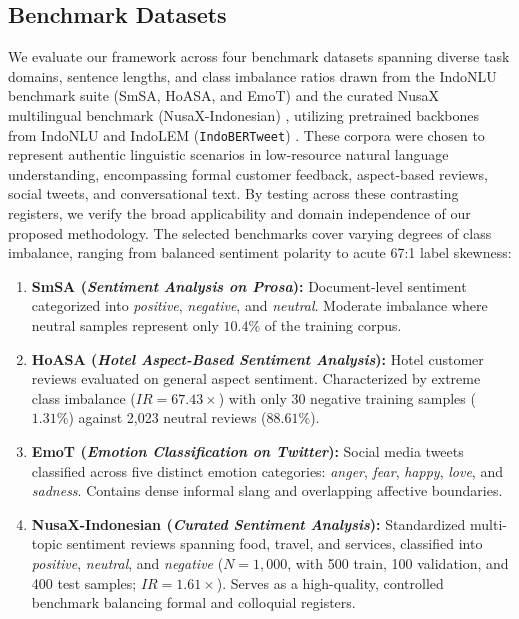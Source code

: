 \documentclass{ieeeaccess}
\begin{document}
\begin{table}[!t]
\caption{Benchmark Dataset Statistics and Split Distributions Across the Four Evaluated Corpora}
\label{tab:dataset_stats}
\centering
\footnotesize
\setlength{\tabcolsep}{4.5pt}

\end{table}

\subsection{Benchmark Datasets}
\label{subsec:datasets}

We evaluate our framework across four benchmark datasets spanning diverse task domains, sentence lengths, and class imbalance ratios drawn from the IndoNLU benchmark suite (SmSA, HoASA, and EmoT) \cite{wilie2020indonlu} and the curated NusaX multilingual benchmark (NusaX-Indonesian) \cite{winata2023nusax}, utilizing pretrained backbones from IndoNLU and IndoLEM (\texttt{IndoBERTweet}) \cite{koto2020indolem}. These corpora were chosen to represent authentic linguistic scenarios in low-resource natural language understanding, encompassing formal customer feedback, aspect-based reviews, social tweets, and conversational text. By testing across these contrasting registers, we verify the broad applicability and domain independence of our proposed methodology. The selected benchmarks cover varying degrees of class imbalance, ranging from balanced sentiment polarity to acute 67:1 label skewness:
\begin{enumerate}
    \item \textbf{SmSA (\textit{Sentiment Analysis on Prosa}):} Document-level sentiment categorized into \textit{positive}, \textit{negative}, and \textit{neutral}. Moderate imbalance where neutral samples represent only $10.4\%$ of the training corpus.
    \item \textbf{HoASA (\textit{Hotel Aspect-Based Sentiment Analysis}):} Hotel customer reviews evaluated on general aspect sentiment. Characterized by extreme class imbalance ($IR = 67.43\times$) with only 30 negative training samples ($1.31\%$) against 2,023 neutral reviews ($88.61\%$).
    \item \textbf{EmoT (\textit{Emotion Classification on Twitter}):} Social media tweets classified across five distinct emotion categories: \textit{anger}, \textit{fear}, \textit{happy}, \textit{love}, and \textit{sadness}. Contains dense informal slang and overlapping affective boundaries.
    \item \textbf{NusaX-Indonesian (\textit{Curated Sentiment Analysis}):} Standardized multi-topic sentiment reviews \cite{winata2023nusax} spanning food, travel, and services, classified into \textit{positive}, \textit{neutral}, and \textit{negative} ($N=1{,}000$, with 500 train, 100 validation, and 400 test samples; $IR = 1.61\times$). Serves as a high-quality, controlled benchmark balancing formal and colloquial registers.
\end{enumerate}
\end{document}
